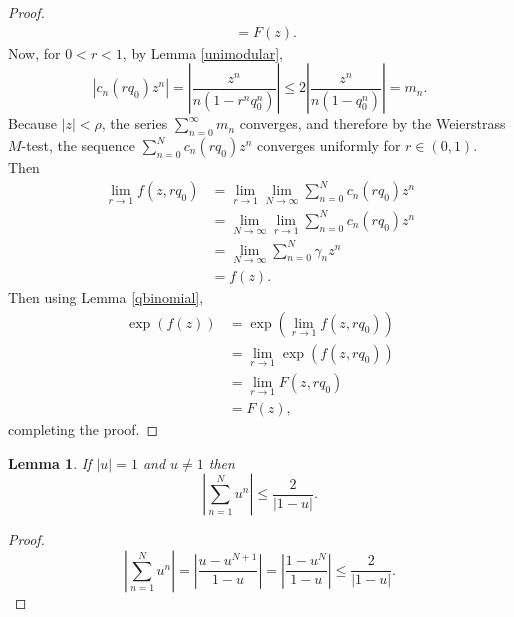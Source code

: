 \documentclass{article}
\newtheorem{lemma}[theorem]{Lemma}
\begin{document}
\begin{proof}
\begin{align*}
&=F(z).
\end{align*}
Now, for $0<r<1$, by Lemma \ref{unimodular},
\[
|c_n(rq_0)z^n| = \left| \frac{z^n}{n(1-r^n q_0^n)} \right|
\leq 2 \left| \frac{z^n}{n(1-q_0^n)} \right|
=m_n.
\]
Because $|z|<\rho$, the series $\sum_{n=0}^\infty m_n$ converges, and therefore by the Weierstrass $M$-test, 
the sequence $\sum_{n=0}^N c_n(rq_0) z^n$ converges uniformly for $r \in (0,1)$. Then
\begin{align*}
\lim_{r \to 1} f(z,rq_0)&=\lim_{r \to 1} \lim_{N \to \infty} \sum_{n=0}^N c_n(rq_0)z^n\\
&=\lim_{N \to \infty} \lim_{r \to 1}  \sum_{n=0}^N c_n(rq_0)z^n\\
&=\lim_{N \to \infty} \sum_{n=0}^N \gamma_n z^n\\
&=f(z).
\end{align*}
Then using Lemma \ref{qbinomial},
\begin{align*}
\exp(f(z))&=\exp\left( \lim_{r \to 1} f(z,rq_0) \right)\\
&=\lim_{r \to 1} \exp(f(z,rq_0))\\
&=\lim_{r \to 1} F(z,rq_0)\\
&=F(z),
\end{align*}
completing the proof.
\end{proof}


\begin{lemma}
If $|u|=1$ and $u \neq 1$ then
\[
\left| \sum_{n=1}^N u^n \right|  \leq \frac{2}{|1-u|}.
\]
\label{geometricbound}
\end{lemma}
\begin{proof}
\[
\left| \sum_{n=1}^N u^n \right| = \left| \frac{u-u^{N+1}}{1-u} \right| = \left| \frac{1-u^N}{1-u} \right| \leq \frac{2}{|1-u|}.
\]
\end{proof}
\end{document}
